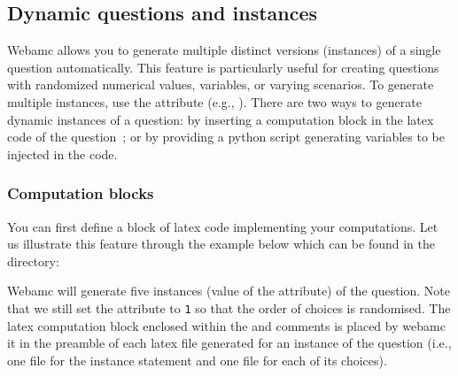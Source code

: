 \subsection{Dynamic questions and instances}
\label{subsec:submission/dynamic}
Webamc allows you to generate multiple distinct versions (instances)
of a single question automatically. This feature is particularly
useful for creating questions with randomized numerical values,
variables, or varying scenarios. To generate multiple instances, use
the  attribute (e.g., ). There are two ways to generate dynamic instances of
a question: by inserting a computation block in the latex code of the
question~; or by providing a python script generating variables to be
injected in the code.

\subsubsection{Computation blocks}
You can first define a block of latex code implementing your
computations. Let us illustrate this feature through the example below
which can be found in the  directory:


Webamc will generate five instances (value of the 
attribute) of the question. Note that we still set the 
attribute to {\tt 1} so that the order of choices is randomised. The
latex computation block enclosed within the  and  comments is placed by webamc
it in the preamble of each latex file generated for an instance of the
question (i.e., one file for the instance statement and one file for
each of its choices).

